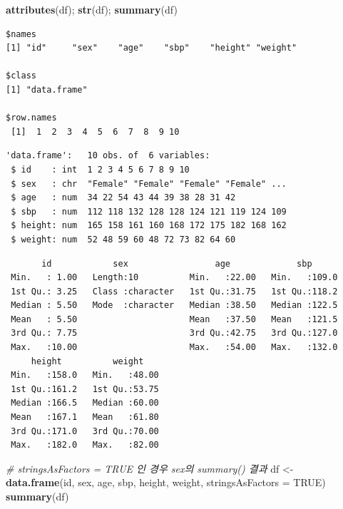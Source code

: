\documentclass[
  11pt,
]{krantz}
\newenvironment{Shaded}{\begin{snugshade}}{\end{snugshade}}
\newcommand{\CommentTok}[1]{\textcolor[rgb]{0.37,0.37,0.37}{\textit{#1}}}
\newcommand{\DataTypeTok}[1]{\textcolor[rgb]{0.27,0.27,0.27}{#1}}
\newcommand{\KeywordTok}[1]{\textcolor[rgb]{0.27,0.27,0.27}{\textbf{#1}}}
\newcommand{\NormalTok}[1]{#1}
\newcommand{\OtherTok}[1]{\textcolor[rgb]{0.37,0.37,0.37}{#1}}
\newcommand{\StringTok}[1]{\textcolor[rgb]{0.5,0.5,0.5}{#1}}
\begin{document}
\begin{Shaded}
\begin{Highlighting}[]
\KeywordTok{attributes}\NormalTok{(df); }\KeywordTok{str}\NormalTok{(df); }\KeywordTok{summary}\NormalTok{(df)}
\end{Highlighting}
\end{Shaded}

\begin{verbatim}
$names
[1] "id"     "sex"    "age"    "sbp"    "height" "weight"

$class
[1] "data.frame"

$row.names
 [1]  1  2  3  4  5  6  7  8  9 10
\end{verbatim}

\begin{verbatim}
'data.frame':   10 obs. of  6 variables:
 $ id    : int  1 2 3 4 5 6 7 8 9 10
 $ sex   : chr  "Female" "Female" "Female" "Female" ...
 $ age   : num  34 22 54 43 44 39 38 28 31 42
 $ sbp   : num  112 118 132 128 128 124 121 119 124 109
 $ height: num  165 158 161 160 168 172 175 182 168 162
 $ weight: num  52 48 59 60 48 72 73 82 64 60
\end{verbatim}

\begin{verbatim}
       id            sex                 age             sbp       
 Min.   : 1.00   Length:10          Min.   :22.00   Min.   :109.0  
 1st Qu.: 3.25   Class :character   1st Qu.:31.75   1st Qu.:118.2  
 Median : 5.50   Mode  :character   Median :38.50   Median :122.5  
 Mean   : 5.50                      Mean   :37.50   Mean   :121.5  
 3rd Qu.: 7.75                      3rd Qu.:42.75   3rd Qu.:127.0  
 Max.   :10.00                      Max.   :54.00   Max.   :132.0  
     height          weight     
 Min.   :158.0   Min.   :48.00  
 1st Qu.:161.2   1st Qu.:53.75  
 Median :166.5   Median :60.00  
 Mean   :167.1   Mean   :61.80  
 3rd Qu.:171.0   3rd Qu.:70.00  
 Max.   :182.0   Max.   :82.00  
\end{verbatim}

\begin{Shaded}
\begin{Highlighting}[]
\CommentTok{# stringsAsFactors = TRUE 인 경우 sex의 summary() 결과}
\NormalTok{df <-}\StringTok{ }\KeywordTok{data.frame}\NormalTok{(id, sex, age, sbp, height, weight, }
                 \DataTypeTok{stringsAsFactors =} \OtherTok{TRUE}\NormalTok{)}
\KeywordTok{summary}\NormalTok{(df)}
\end{Highlighting}
\end{Shaded}
\end{document}
